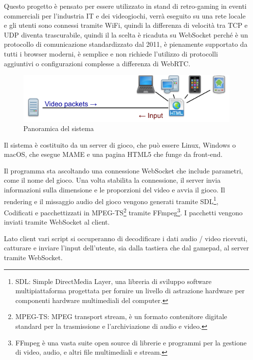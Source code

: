 Questo progetto è pensato per essere utilizzato in stand di retro-gaming in eventi commerciali per l'industria IT e dei videogiochi, verrà eseguito su una rete locale e gli utenti sono connessi tramite WiFi, quindi la differenza di velocità tra TCP e UDP diventa trascurabile, quindi il la scelta è ricaduta su WebSocket perché è un protocollo di comunicazione standardizzato dal 2011, è pienamente supportato da tutti i browser moderni, è semplice e non richiede l'utilizzo di protocolli aggiuntivi o configurazioni complesse a differenza di WebRTC.

\begin{figure}[H]
	\includegraphics[width=\linewidth]{immagini/proposed_system}
	\caption{Panoramica del sistema}
	\label{fig:proposed_system}
\end{figure}

Il sistema è costituito da un server di gioco, che può essere Linux, Windows o macOS, che esegue MAME e una pagina HTML5 che funge da front-end.

Il programma sta ascoltando una connessione WebSocket che include parametri, come il nome del gioco. Una volta stabilita la connessione, il server invia informazioni sulla dimensione e le proporzioni del video e avvia il gioco. Il rendering e il missaggio audio del gioco vengono generati tramite SDL\footnote{SDL: Simple DirectMedia Layer, una libreria di sviluppo software multipiattaforma progettata per fornire un livello di astrazione hardware per componenti hardware multimediali del computer.}, Codificati e pacchettizzati in MPEG-TS\footnote{MPEG-TS: MPEG transport stream, è un formato contenitore digitale standard per la trasmissione e l'archiviazione di audio e video.} tramite FFmpeg\footnote{FFmpeg è una vasta suite open source di librerie e programmi per la gestione di video, audio, e altri file multimediali e stream.}. I pacchetti vengono inviati tramite WebSocket al client.

Lato client vari script si occuperanno di decodificare i dati audio / video ricevuti, catturare e inviare l'input dell'utente, sia dalla tastiera che dal gamepad, al server tramite WebSocket.